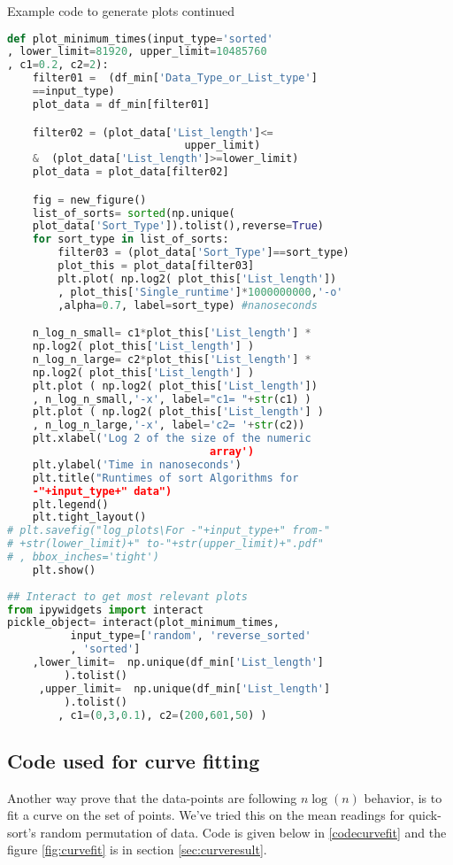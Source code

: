 \documentclass[sigconf, nonacm, natbib, screen, balance=False]{acmart}
\begin{document}
\begin{listing}
  \caption{Example code to generate plots continued}
  \label{plot function02}
\begin{lstlisting}[language=Python]
def plot_minimum_times(input_type='sorted'
, lower_limit=81920, upper_limit=10485760
, c1=0.2, c2=2):
    filter01 =  (df_min['Data_Type_or_List_type']
    ==input_type)
    plot_data = df_min[filter01]

    filter02 = (plot_data['List_length']<=
                            upper_limit) 
    &  (plot_data['List_length']>=lower_limit)
    plot_data = plot_data[filter02]

    fig = new_figure()
    list_of_sorts= sorted(np.unique(
    plot_data['Sort_Type']).tolist(),reverse=True)
    for sort_type in list_of_sorts:
        filter03 = (plot_data['Sort_Type']==sort_type)
        plot_this = plot_data[filter03]         
        plt.plot( np.log2( plot_this['List_length']) 
        , plot_this['Single_runtime']*1000000000,'-o' 
        ,alpha=0.7, label=sort_type) #nanoseconds

    n_log_n_small= c1*plot_this['List_length'] *
    np.log2( plot_this['List_length'] )
    n_log_n_large= c2*plot_this['List_length'] *
    np.log2( plot_this['List_length'] )
    plt.plot ( np.log2( plot_this['List_length']) 
    , n_log_n_small,'-x', label="c1= "+str(c1) )
    plt.plot ( np.log2( plot_this['List_length'] )
    , n_log_n_large,'-x', label='c2= '+str(c2))
    plt.xlabel('Log 2 of the size of the numeric 
                                array')
    plt.ylabel('Time in nanoseconds')
    plt.title("Runtimes of sort Algorithms for 
    -"+input_type+" data")
    plt.legend()
    plt.tight_layout()
# plt.savefig("log_plots\For -"+input_type+" from-"
# +str(lower_limit)+" to-"+str(upper_limit)+".pdf"
# , bbox_inches='tight')
    plt.show()
    
## Interact to get most relevant plots
from ipywidgets import interact 
pickle_object= interact(plot_minimum_times,
          input_type=['random', 'reverse_sorted'
          , 'sorted']
    ,lower_limit=  np.unique(df_min['List_length']
         ).tolist() 
     ,upper_limit=  np.unique(df_min['List_length']
         ).tolist()
        , c1=(0,3,0.1), c2=(200,601,50) )
\end{lstlisting}
\end{listing}

\subsection{Code used for curve fitting}\label{sec:curvefitting}
Another way prove that the data-points are following \textbf{$n\log(n)$} behavior, is to fit a curve on the set of points. We've tried this on the mean readings for quick-sort's random permutation of data. Code is given below in \ref{codecurvefit} and the figure \ref{fig:curvefit} is in section \ref{sec:curveresult}.
\end{document}
